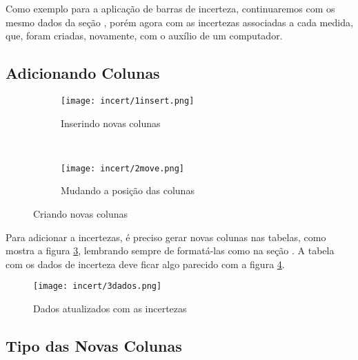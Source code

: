 Como exemplo para a aplicação de barras de incerteza, continuaremos com os mesmo dados da seção , porém agora com as incertezas associadas a cada medida, que, foram criadas, novamente, com o auxílio de um computador.


\subsection{Adicionando Colunas}

    \begin{figure}[htbp]
        \centering
        \begin{subfigure}{0.27\textwidth}
            \centering
            \texttt{[image: incert/1insert.png]}

            \caption{Inserindo novas colunas}
            \label{fig:incert:insert}
        \end{subfigure}
        ~
        \begin{subfigure}{0.35\textwidth}
            \centering
            \texttt{[image: incert/2move.png]}

            \caption{Mudando a posição das colunas}
            \label{fig:incert:mover}
        \end{subfigure}
        \caption{Criando novas colunas}
        \label{fig:incert:colunas}
    \end{figure}

    Para adicionar a incertezas, é preciso gerar novas colunas nas tabelas, como mostra a figura \ref{fig:incert:colunas}, lembrando sempre de formatá-las como na seção . A tabela com os dados de incerteza deve ficar algo parecido com a figura \ref{fig:incert:dados}.

    \begin{figure}[htbp]
        \centering
        \texttt{[image: incert/3dados.png]}

        \caption{Dados atualizados com as incertezas}
        \label{fig:incert:dados}
    \end{figure}


\subsection{Tipo das Novas Colunas}

